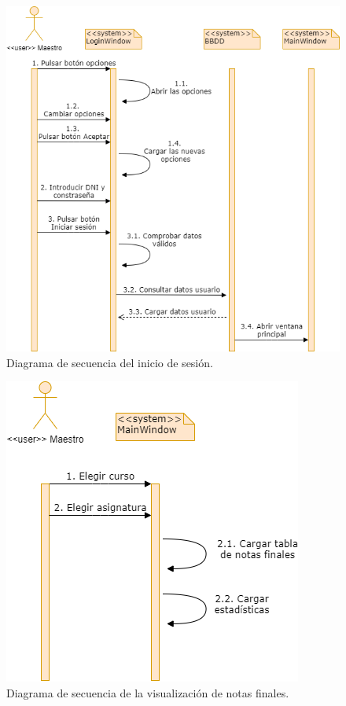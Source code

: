 \begin{figure}[H]
\centering\includegraphics[width=0.75\linewidth]{figs/dia_iniciarsesion.png}
\caption{Diagrama de secuencia del inicio de sesión.}
\label{Fig:dia_iniciarsesion}
\end{figure}

\begin{figure}[H]
\centering\includegraphics[width=0.5\linewidth]{figs/dia_mainwindow.png}
\caption{Diagrama de secuencia de la visualización de notas finales.}
\label{Fig:dia_mainwindow}
\end{figure}

